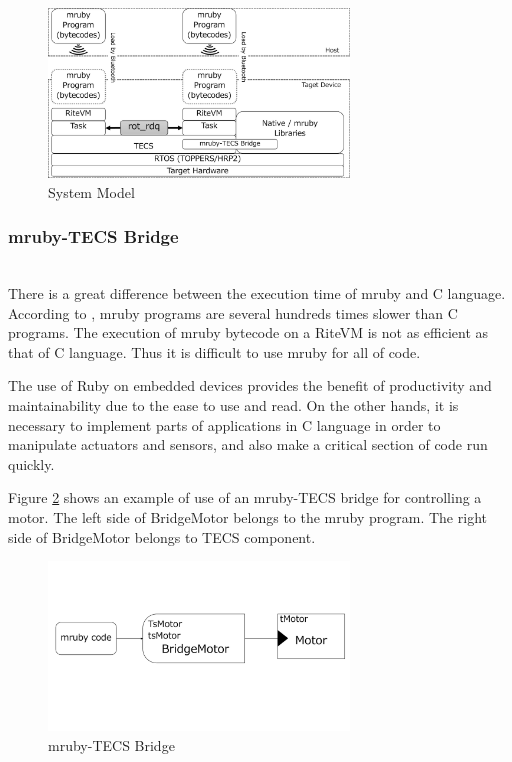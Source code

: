 \documentclass[conference,compsoc]{IEEEtran}
\begin{document}
\begin{figure}[t]
    \centering
    \includegraphics[width=8cm,clip]{figure/system_model.pdf}
    \caption{System Model}
    \label{fig:system_model}
\end{figure}

\subsubsection{mruby-TECS Bridge}\mbox{}\\

There is a great difference between the execution time of mruby and C language.
According to  \cite{7153813}, mruby programs are several hundreds times slower than C programs.
The execution of mruby bytecode on a RiteVM is not as efficient as that of C language.
Thus it is difficult to use mruby for all of code.

The use of Ruby on embedded devices provides the benefit of productivity and maintainability due to the ease to use and read.
On the other hands, it is necessary to implement parts of applications in C language in order to manipulate actuators and sensors, and also make a critical section of code run quickly.

Figure \ref{fig:mruby_TECS_bridge} shows an example of use of an mruby-TECS bridge for controlling a motor.
The left side of BridgeMotor belongs to the mruby program.
The right side of BridgeMotor belongs to TECS component.
\begin{figure}[t]
    \centering
    \includegraphics[width=8cm,clip]{figure/mruby_TECS_bridge.pdf}
    \caption{mruby-TECS Bridge}
    \label{fig:mruby_TECS_bridge}
\end{figure}
\end{document}
